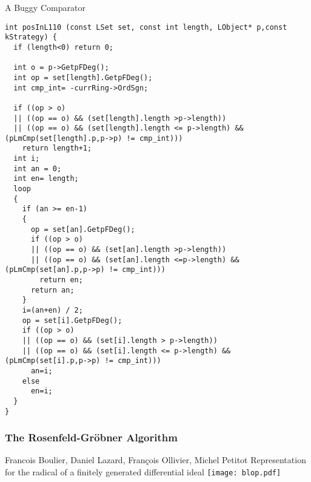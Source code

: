 \documentclass[11pt]{beamer}
\begin{document}
\begin{frame}[fragile]{A Buggy Comparator}
\tiny\begin{verbatim}
int posInL110 (const LSet set, const int length, LObject* p,const kStrategy) {
  if (length<0) return 0;

  int o = p->GetpFDeg();
  int op = set[length].GetpFDeg();
  int cmp_int= -currRing->OrdSgn;

  if ((op > o)
  || ((op == o) && (set[length].length >p->length))
  || ((op == o) && (set[length].length <= p->length) && (pLmCmp(set[length].p,p->p) != cmp_int)))
    return length+1;
  int i;
  int an = 0;
  int en= length;
  loop
  {
    if (an >= en-1)
    {
      op = set[an].GetpFDeg();
      if ((op > o)
      || ((op == o) && (set[an].length >p->length))
      || ((op == o) && (set[an].length <=p->length) && (pLmCmp(set[an].p,p->p) != cmp_int)))
        return en;
      return an;
    }
    i=(an+en) / 2;
    op = set[i].GetpFDeg();
    if ((op > o)
    || ((op == o) && (set[i].length > p->length))
    || ((op == o) && (set[i].length <= p->length) && (pLmCmp(set[i].p,p->p) != cmp_int)))
      an=i;
    else
      en=i;
  }
}
\end{verbatim}
\end{frame}

\begin{frame}
\frametitle{The Rosenfeld-Gr\"obner Algorithm}
\begin{exampleblock}{Francois Boulier, Daniel Lazard, François Ollivier, Michel Petitot
Representation for the radical of a finitely generated differential ideal
}
\texttt{[image: blop.pdf]}
\end{exampleblock}
\end{frame}
\end{document}
